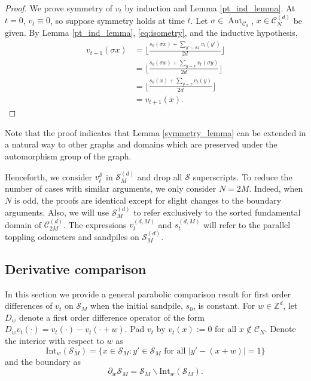 \documentclass[12pt]{amsart}
\newcommand{\Z}{\mathbb{Z}}
\begin{document}
	\begin{proof}
		We prove symmetry of $v_t$ by induction and Lemma \ref{pt_ind_lemma}. 
		At $t = 0$, $v_t \equiv 0$, so suppose symmetry holds at time $t$. Let $ \sigma \in \operatorname{Aut}_{\mathcal{C}_d}$, $x \in \mathcal{C}_{N}^{(d)}$ be given. By Lemma \ref{pt_ind_lemma},
		 \eqref{eq:isometry}, and the inductive hypothesis, 
		\begin{align*}
		v_{t+1}( \sigma x) &= \lfloor \frac{ s_0( \sigma x) + \sum_{y' \sim  \sigma x} v_t( y')}{2d} \rfloor \\
		&= \lfloor \frac{ s_0( \sigma x) + \sum_{y \sim x} v_t( \sigma y)}{2d} \rfloor \\
		&= \lfloor \frac{  s_0(x) + \sum_{y \sim x} v_t(y)}{2d} \rfloor \\
		&= v_{t+1}(x). 
		\end{align*}
	\end{proof}
	\noindent Note that the proof indicates that Lemma \ref{symmetry_lemma} can be extended in a natural way to 
	other graphs and domains which are preserved under the automorphism group of the graph. 
	
	
	Henceforth, we consider $v_t^{\mathcal{S}}$ in $\mathcal{S}_M^{(d)}$ and drop all $\mathcal{S}$ superscripts. To reduce the number of cases with similar 
	arguments, we only consider $N = 2 M$. Indeed, when $N$ is odd, the proofs
	are identical except for slight changes to the boundary arguments. Also, we will use $\mathcal{S}_M^{(d)}$ to refer exclusively to the sorted fundamental domain of $\mathcal{C}_{2M}^{(d)}$. The expressions $v_t^{(d,M)}$  and $s_t^{(d,M)}$ will refer to the parallel toppling odometers and sandpiles on $\mathcal{S}_M^{(d)}$. 
	
	
	\subsection{Derivative comparison}
	In this section we provide a general parabolic comparison result for first order differences of $v_t$ on $\mathcal{S}_M$
	when the initial sandpile, $s_0$, is constant. For $w \in \Z^d$, let $D_{w}$ denote a first order difference operator of the form $D_{w} v_t(\cdot) = v_t(\cdot) - v_t(\cdot+w)$. Pad $v_t$ by $v_t(x) := 0$ for all $x \not \in \mathcal{C}_N$.  
	Denote the interior with respect to $w$ as 
	\begin{equation}
	\mbox{Int}_w(\mathcal{S}_M) = \{ x \in \mathcal{S}_M : y' \in \mathcal{S}_M \mbox{ for all $|y'-(x+w)| = 1$} \}
	\end{equation}
	and the boundary as 
	\begin{equation}
	\partial_w \mathcal{S}_M = \mathcal{S}_M \backslash \mbox{Int}_w(\mathcal{S}_M).  
	\end{equation}
\end{document}
